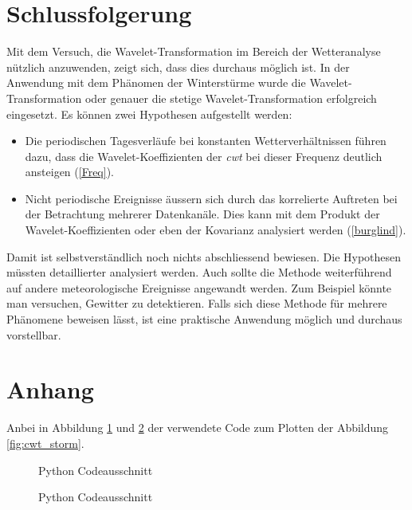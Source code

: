 \begin{refsection}
\section{Schlussfolgerung}

Mit dem Versuch, die Wavelet-Transformation im Bereich der Wetteranalyse nützlich anzuwenden, zeigt sich, dass dies durchaus möglich ist.
In der Anwendung mit dem Phänomen der Winterstürme wurde die Wavelet-Transformation oder genauer die stetige Wavelet-Transformation erfolgreich eingesetzt.
Es können zwei Hypothesen aufgestellt werden:
\begin{itemize}
	\item Die periodischen Tagesverläufe bei konstanten Wetterverhältnissen führen dazu, dass die Wavelet-Koeffizienten der \textit{cwt} bei dieser Frequenz deutlich ansteigen (\ref{Freq}).
	
	\item Nicht periodische Ereignisse äussern sich durch das korrelierte Auftreten bei der Betrachtung mehrerer Datenkanäle. Dies kann mit dem Produkt der Wavelet-Koeffizienten oder eben der Kovarianz analysiert werden (\ref{burglind}).
\end{itemize}


Damit ist selbstverständlich noch nichts abschliessend bewiesen. Die Hypothesen müssten detaillierter analysiert werden.
Auch sollte die Methode weiterführend auf andere meteorologische Ereignisse angewandt werden.
Zum Beispiel könnte man versuchen, Gewitter zu detektieren.
Falls sich diese Methode für mehrere Phänomene beweisen lässt, ist eine praktische Anwendung möglich und durchaus vorstellbar. 

\section{Anhang}
Anbei in Abbildung \ref{fig:python-plot-code} und \ref{fig:python-plot-code2} der verwendete Code zum Plotten der Abbildung \ref{fig:cwt_storm}.

\begin{figure}[h]
	\centering
	
	\caption{Python Codeausschnitt}
	\label{fig:python-plot-code}
\end{figure}
\begin{figure}[h]
	\centering
	
	\caption{Python Codeausschnitt}
	\label{fig:python-plot-code2}
\end{figure}
 

\printbibliography[heading=subbibliography]
\end{refsection}
